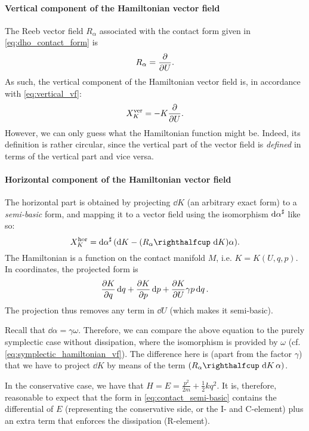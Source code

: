 \paragraph{Vertical component of the Hamiltonian vector field} The Reeb vector field \(R_\alpha\) associated with the contact form given in \cref{eq:dho_contact_form} is 
\begin{equation}
     R_\alpha = \pdv{}{U}.
\end{equation}
As such, the vertical component of the Hamiltonian vector field is, in accordance with \cref{eq:vertical_vf}:
\begin{equation}
    X_K^\text{ver} = -K\pdv{}{U}.
    \label{eq:dho_vertical}
\end{equation}
However, we can only guess what the Hamiltonian function might be. Indeed, its definition is rather circular, since the vertical part of the vector field is \emph{defined} in terms of the vertical part and vice versa.

\paragraph{Horizontal component of the Hamiltonian vector field} The horizontal part is obtained by projecting \(\dd{K}\) (an arbitrary exact form) to a \emph{semi-basic} form, and mapping it to a vector field using the isomorphism \(\dd{\alpha}^\sharp\) like so:
\begin{equation}
     X_K^\text{hor} = \fromDual{\dd{\alpha}}(\dd{K} - \qty(\intpr{R_\alpha}{\dd{K}})\alpha).
\end{equation}
The Hamiltonian is a function on the contact manifold \(M\), i.e. \(K = K(U, q, p)\). In coordinates, the projected form is
\begin{equation}
    \pdv{K}{q}\dd{q} + \pdv{K}{p}\dd{p} + \pdv{K}{U} \gamma p \dd{q}.
    \label{eq:contact_semi-basic}
\end{equation}
The projection thus removes any term in \(\dd{U}\) (which makes it semi-basic).

Recall that \(\dd{\alpha} = \gamma \omega \). Therefore, we can compare the above equation to the purely symplectic case without dissipation, where the isomorphism is provided by \(\omega\) (cf. \cref{eq:symplectic_hamiltonian_vf}). The difference here is (apart from the factor \(\gamma\)) that we have to project \(\dd{K}\) by means of the term \(\qty(\intpr{R_\alpha}{\dd{K}}\alpha)\).

In the conservative case, we have that \(H = E = \frac{p^2}{2m} + \frac{1}{2}kq^2\). It is, therefore, reasonable to expect that the form in \cref{eq:contact_semi-basic} contains the differential of \(E\) (representing the conservative side, or the I- and C-element) plus an extra term that enforces the dissipation (R-element). 

